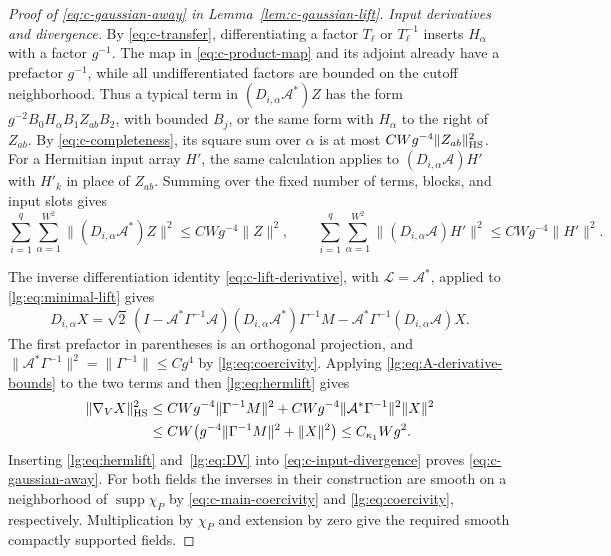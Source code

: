 \documentclass[11pt]{article}
\numberwithin{equation}{section}
\theoremstyle{remark}
\newcommand{\supp}{\operatorname{supp}}
\begin{document}
\begin{proof}[Proof of \eqref{eq:c-gaussian-away} in Lemma~\ref{lem:c-gaussian-lift}]
\smallskip\noindent\emph{Input derivatives and divergence.}
By \eqref{eq:c-transfer},
differentiating a factor $T_\ell$ or $T_\ell^{-1}$ inserts $H_\alpha$
with a factor $g^{-1}$. The map in \eqref{eq:c-product-map} and its
adjoint already have a prefactor $g^{-1}$, while all
undifferentiated factors are bounded on the cutoff neighborhood.
Thus a typical term in $(D_{i,\alpha}\mathcal A^*)Z$ has the form
$g^{-2}B_0H_\alpha B_1Z_{ab}B_2$, with bounded $B_j$, or the same
form with $H_\alpha$ to the right of $Z_{ab}$. By
\eqref{eq:c-completeness}, its square sum over $\alpha$ is at most
$CWg^{-4}\|Z_{ab}\|_{\rm HS}^2$.
For a Hermitian input array $H'$, the same calculation applies to
$(D_{i,\alpha}\mathcal A)H'$ with $H'_k$ in place of $Z_{ab}$.
Summing over the fixed number of
terms, blocks, and input slots gives
\begin{equation}\label{lg:eq:A-derivative-bounds}
 \sum_{i=1}^q\sum_{\alpha=1}^{W^2}\|(D_{i,\alpha}\mathcal A^*)Z\|^2\le CWg^{-4}\|Z\|^2,\qquad
 \sum_{i=1}^q\sum_{\alpha=1}^{W^2}\|(D_{i,\alpha}\mathcal A)H'\|^2\le CWg^{-4}\|H'\|^2.
\end{equation}

The inverse differentiation identity \eqref{eq:c-lift-derivative},
with $\mathcal L=\mathcal A^*$, applied to \eqref{lg:eq:minimal-lift} gives
\[
 D_{i,\alpha}X=\sqrt2\,(I-\mathcal A^*\Gamma^{-1}\mathcal A)
       (D_{i,\alpha}\mathcal A^*)\Gamma^{-1}M
       -\mathcal A^*\Gamma^{-1}(D_{i,\alpha}\mathcal A)X.
\]
The first prefactor in parentheses is an orthogonal projection, and
$\|\mathcal A^*\Gamma^{-1}\|^2=\|\Gamma^{-1}\|\le Cg^4$ by
\eqref{lg:eq:coercivity}. Applying \eqref{lg:eq:A-derivative-bounds}
to the two terms and then \eqref{lg:eq:hermlift} gives
\begin{equation}\label{lg:eq:DV}
 \begin{aligned}
 \|\nabla_VX\|_{\rm HS}^2
 &\le CWg^{-4}\|\Gamma^{-1}M\|^2
       +CWg^{-4}\|\mathcal A^*\Gamma^{-1}\|^2\|X\|^2\\
 &\le CW\bigl(g^{-4}\|\Gamma^{-1}M\|^2+\|X\|^2\bigr)
 \le C_{\kappa_1}Wg^2.
 \end{aligned}
\end{equation}
Inserting \eqref{lg:eq:hermlift} and~\eqref{lg:eq:DV} into
\eqref{eq:c-input-divergence} proves \eqref{eq:c-gaussian-away}.
For both fields the inverses in their construction are smooth on a
neighborhood of $\supp\chi_P$ by \eqref{eq:c-main-coercivity} and
\eqref{lg:eq:coercivity}, respectively. Multiplication by $\chi_P$
and extension by zero give the required smooth compactly supported fields.
\end{proof}
\end{document}
